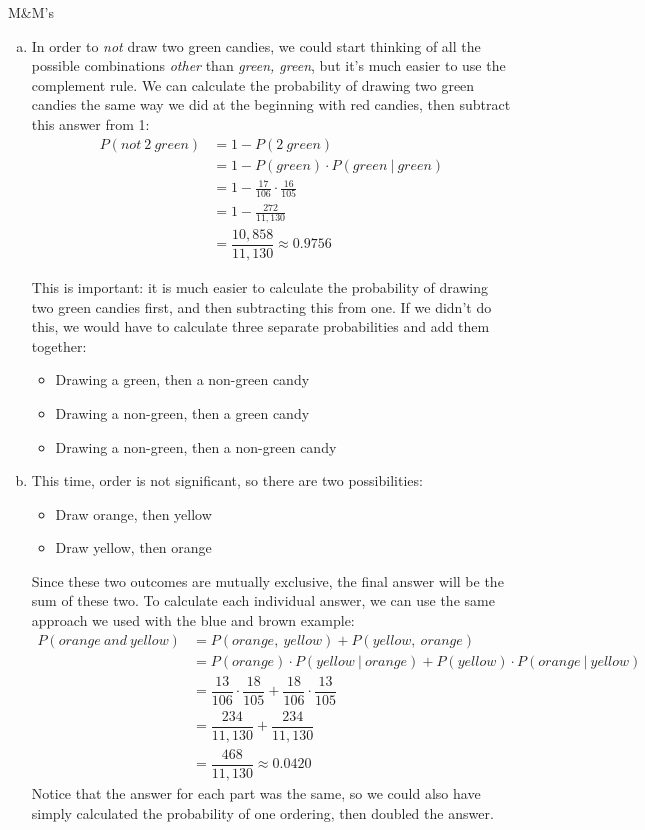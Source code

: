 \begin{example}[https://www.youtube.com/watch?v=j8BFTGwza9s&list=PLfmpjsIzhzts14-9s5QixRje97EI2oeMF&index=24]{M\&M's}
\begin{enumerate}[(a)]
\item In order to \emph{not} draw two green candies, we could start thinking of all the possible combinations \emph{other} than \emph{green, green}, but it's much easier to use the complement rule.  We can calculate the probability of drawing two green candies the same way we did at the beginning with red candies, then subtract this answer from 1:
\begin{align*}
P(not\ 2\ green) &= 1-P(2 \ green)\\
&= 1 - P(green) \cdot P(green \ | \ green)\\
&= 1-\frac{17}{106} \cdot \frac{16}{105}\\
&= 1 - \frac{272}{11,130}\\
&= \boxed{\dfrac{10,858}{11,130} \approx 0.9756}
\end{align*}

This is important: it is much easier to calculate the probability of drawing two green candies first, and then subtracting this from one.  If we didn't do this, we would have to calculate three separate probabilities and add them together:
\begin{itemize}
\item Drawing a green, then a non-green candy
\item Drawing a non-green, then a green candy
\item Drawing a non-green, then a non-green candy
\end{itemize}

\item This time, order is not significant, so there are two possibilities:
\begin{itemize}
\item Draw orange, then yellow
\item Draw yellow, then orange
\end{itemize}
Since these two outcomes are mutually exclusive, the final answer will be the sum of these two.  To calculate each individual answer, we can use the same approach we used with the blue and brown example:
\begin{align*}
P(orange\ and\ yellow) &= P(orange,\ yellow) + P(yellow,\ orange)\\
&= P(orange) \cdot P(yellow\ |\ orange) + P(yellow) \cdot P(orange\ |\ yellow)\\
&= \dfrac{13}{106} \cdot \dfrac{18}{105} + \dfrac{18}{106} \cdot \dfrac{13}{105}\\
&= \dfrac{234}{11,130} + \dfrac{234}{11,130}\\
&= \boxed{\dfrac{468}{11,130} \approx 0.0420}
\end{align*}
Notice that the answer for each part was the same, so we could also have simply calculated the probability of one ordering, then doubled the answer.
\end{enumerate}
\end{example}
